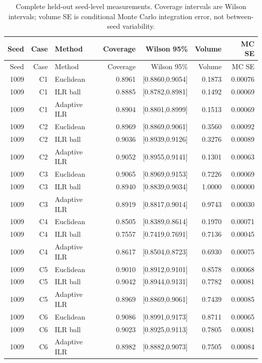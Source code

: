 \begin{longtable}{rrlrrrr}
\caption{Complete held-out seed-level measurements. Coverage intervals are Wilson intervals; volume SE is conditional Monte Carlo integration error, not between-seed variability.}\\
\toprule
Seed & Case & Method & Coverage & Wilson 95\% & Volume & MC SE \\
\midrule\endfirsthead
\toprule Seed & Case & Method & Coverage & Wilson 95\% & Volume & MC SE \\ \midrule\endhead
1009 & C1 & Euclidean & 0.8961 & [0.8860,0.9054] & 0.1873 & 0.00076 \\
1009 & C1 & ILR ball & 0.8885 & [0.8782,0.8981] & 0.1492 & 0.00069 \\
1009 & C1 & Adaptive ILR & 0.8904 & [0.8801,0.8999] & 0.1513 & 0.00069 \\
1009 & C2 & Euclidean & 0.8969 & [0.8869,0.9061] & 0.3560 & 0.00092 \\
1009 & C2 & ILR ball & 0.9036 & [0.8939,0.9126] & 0.3276 & 0.00089 \\
1009 & C2 & Adaptive ILR & 0.9052 & [0.8955,0.9141] & 0.1301 & 0.00063 \\
1009 & C3 & Euclidean & 0.9065 & [0.8969,0.9153] & 0.7226 & 0.00069 \\
1009 & C3 & ILR ball & 0.8940 & [0.8839,0.9034] & 1.0000 & 0.00000 \\
1009 & C3 & Adaptive ILR & 0.8919 & [0.8817,0.9014] & 0.9743 & 0.00030 \\
1009 & C4 & Euclidean & 0.8505 & [0.8389,0.8614] & 0.1970 & 0.00071 \\
1009 & C4 & ILR ball & 0.7557 & [0.7419,0.7691] & 0.7136 & 0.00045 \\
1009 & C4 & Adaptive ILR & 0.8617 & [0.8504,0.8723] & 0.6930 & 0.00075 \\
1009 & C5 & Euclidean & 0.9010 & [0.8912,0.9101] & 0.8578 & 0.00068 \\
1009 & C5 & ILR ball & 0.9042 & [0.8944,0.9131] & 0.7782 & 0.00081 \\
1009 & C5 & Adaptive ILR & 0.8969 & [0.8869,0.9061] & 0.7439 & 0.00085 \\
1009 & C6 & Euclidean & 0.9086 & [0.8991,0.9173] & 0.8711 & 0.00065 \\
1009 & C6 & ILR ball & 0.9023 & [0.8925,0.9113] & 0.7805 & 0.00081 \\
1009 & C6 & Adaptive ILR & 0.8982 & [0.8882,0.9073] & 0.7505 & 0.00084 \\

\end{longtable}
